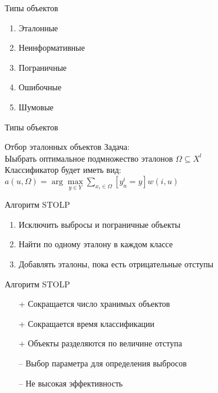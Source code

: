 \documentclass[10pt]{beamer}
\begin{document}
\begin{frame}{Типы объектов}
	\begin{enumerate}
		\item Эталонные
		\item Неинформативные
		\item Пограничные	
		\item Ошибочные	
		\item Шумовые	
	\end{enumerate}
\end{frame}

\begin{frame}{Типы объектов}
\end{frame}


\begin{frame}{Отбор эталонных объектов}
	\alert{Задача}:\\
	Ыыбрать оптимальное подмножество эталонов $\Omega\subseteq X^l$\\ 
  \bigbreak
	Классификатор будет иметь вид:\\
	${a(u, \Omega) = \arg\max\limits_{y \in Y} \sum\limits_{x_i \in \Omega} [y_u^i = y]w(i, u) }$\\
\end{frame}

\begin{frame}{Алгоритм STOLP}
	\begin{enumerate}
		\item Исключить выбросы и пограничные объекты
		\item Найти по одному эталону в каждом классе
		\item Добавлять эталоны, пока есть отрицательные отступы	
	\end{enumerate}
\end{frame}

\begin{frame}{Алгоритм STOLP}
	\begin{itemize} [<+- | alert@+>]
	\item[+] Сокращается число хранимых объектов
	\item[+] Сокращается время классификации
	\item[+] Объекты разделяются по величине отступа
	\bigbreak
	\item[--] Выбор параметра для определения выбросов
	\item[--] Не высокая эффективность
	\end{itemize}
\end{frame}
\end{document}
